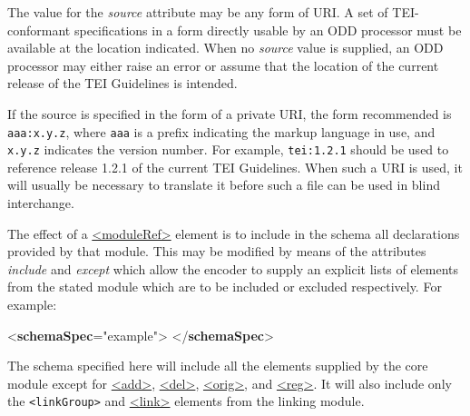 The value for the {\itshape source} attribute may be any form of URI. A set of TEI-conformant specifications in a form directly usable by an ODD processor must be available at the location indicated. When no {\itshape source} value is supplied, an ODD processor may either raise an error or assume that the location of the current release of the TEI Guidelines is intended.\par
If the source is specified in the form of a private URI, the form recommended is \texttt{aaa:x.y.z}, where \texttt{aaa} is a prefix indicating the markup language in use, and \texttt{x.y.z} indicates the version number. For example, \texttt{tei:1.2.1} should be used to reference release 1.2.1 of the current TEI Guidelines. When such a URI is used, it will usually be necessary to translate it before such a file can be used in blind interchange.\par
The effect of a \hyperref[TEI.moduleRef]{<moduleRef>} element is to include in the schema all declarations provided by that module. This may be modified by means of the attributes {\itshape include} and {\itshape except} which allow the encoder to supply an explicit lists of elements from the stated module which are to be included or excluded respectively. For example: \par\bgroup{}\exampleFont \begin{shaded}\noindent\mbox{}{<\textbf{schemaSpec}\hspace*{1em}{ident}="{example}">}\mbox{}\newline 
{}\mbox{}\newline 
{}\mbox{}\newline 
{</\textbf{schemaSpec}>}\end{shaded}\egroup\par \noindent  The schema specified here will include all the elements supplied by the core module except for \hyperref[TEI.add]{<add>}, \hyperref[TEI.del]{<del>}, \hyperref[TEI.orig]{<orig>}, and \hyperref[TEI.reg]{<reg>}. It will also include only the \texttt{<linkGroup>} and \hyperref[TEI.link]{<link>} elements from the linking module.\par
